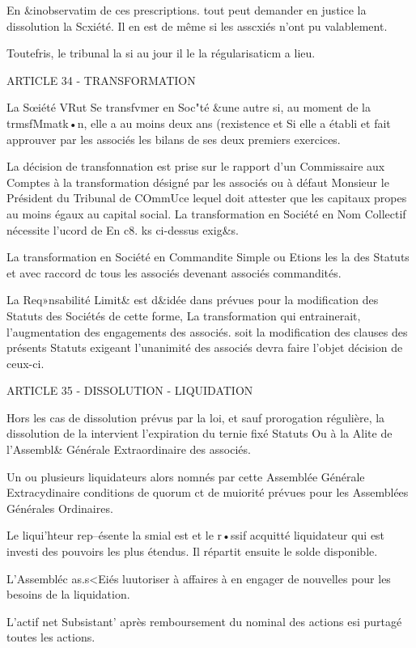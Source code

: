 \documentclass{article}
\begin{document}
En &inobservatim de ces prescriptions. tout peut demander en justice la dissolution la Scxiété. Il en est de même si les asscxiés n'ont pu valablement.

Toutefris, le tribunal la si au jour il le la régularisaticm a lieu.

ARTICLE 34 - TRANSFORMATION

La Sœiété VRut Se transfvmer en Soc"té &une autre si, au moment de la trmsfMmatk•n, elle a au moins deux ans (rexistence et Si elle a établi et fait approuver par les associés les bilans de ses deux premiers exercices.

La décision de transfonnation est prise sur le rapport d'un Commissaire aux Comptes à la transformation désigné par les associés ou à défaut Monsieur le Président du Tribunal de COmmUce lequel doit attester que les capitaux propes au moins égaux au capital social.
La transformation en Société en Nom Collectif nécessite l'ucord de En c8.  ks ci-dessus exig&s.

La transformation en Société en Commandite Simple ou Etions les la des Statuts et avec raccord dc tous les associés devenant associés commandités.

La Req»nsabilité Limit& est d&idée dans prévues pour la modification des Statuts des Sociétés de cette forme,
La transformation qui entrainerait, l'augmentation des engagements des associés. soit la modification des clauses des présents Statuts exigeant l'unanimité des associés devra faire l'objet décision de ceux-ci.

ARTICLE 35 - DISSOLUTION - LIQUIDATION

Hors les cas de dissolution prévus par la loi, et sauf prorogation régulière, la dissolution de la intervient l'expiration du ternie fixé Statuts Ou à la Alite de l'Assembl& Générale Extraordinaire des associés.

Un ou plusieurs liquidateurs alors nomnés par cette Assemblée Générale Extracydinaire conditions de quorum ct de muiorité prévues pour les Assemblées Générales Ordinaires.

Le liqui'hteur rep--ésente la smial est et le r•ssif acquitté liquidateur qui est investi des pouvoirs les plus étendus. Il répartit ensuite le solde disponible.

L'Assembléc as.s<Eiés luutoriser à affaires à en engager de nouvelles pour les besoins de la liquidation.

L'actif net Subsistant' après remboursement du nominal des actions esi purtagé toutes les actions.
\end{document}

